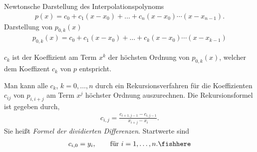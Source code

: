 Newtonsche Darstellung des Interpolationspolynoms
\begin{align*}
p(x) = c_0 + c_1(x-x_0) + \ldots +
c_n(x-x_0)\cdots(x-x_{n-1}).
\end{align*}
Darstellung von $p_{0,k}(x)$
\begin{align*}
p_{0,k}(x) = c_0 + c_1(x-x_0) + \ldots + c_k(x-x_0)\cdots(x-x_{k-1})
\end{align*}
\begin{bemn}
$c_k$ ist der Koeffizient am Term $x^k$
der höchsten Ordnung von $p_{0,k}(x)$, welcher dem Koeffizent $c_k$ von $p$
entspricht.\maphere
\end{bemn}
\begin{corn}
Man kann alle $c_k$, $k=0,\ldots,n$ durch ein Rekursionsverfahren für die
Koeffizienten $c_{ij}$ von $p_{i,i+j}$ am Term $x^j$ höchster Ordnung
auszurechnen. Die Rekursionsformel ist gegeben durch,
\begin{align*}
c_{i,j} = \frac{c_{i+1,j-1} - c_{i,j-1}}{x_{i+j}-x_i}.
\end{align*}
Sie heißt \emph{Formel der dividierten Differenzen}. Startwerte sind
\begin{align*}
c_{i,0} = y_i,\qquad \text{für } i = 1,\ldots,n.\fishhere
\end{align*} 
\end{corn}


